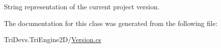 String representation of the current project version. 



The documentation for this class was generated from the following file\-:\begin{DoxyCompactItemize}
\item 
Tri\-Devs.\-Tri\-Engine2\-D/\hyperlink{_version_8cs}{Version.\-cs}\end{DoxyCompactItemize}
